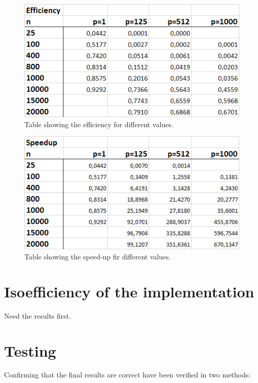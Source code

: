\documentclass[a4paper,11pt,oneside]{book}
\begin{document}
\begin{figure}[H]
  \centering
  \includegraphics[width=0.9\linewidth]{table-eff.png}
  \caption{Table showing the efficiency for different values.}
  \centering
  \label{fig:sub1}
\end{figure}
\begin{figure}[H]
  \centering
  \includegraphics[width=0.9\linewidth]{table-speedup.png}
  \caption{Table showing the speed-up fir different values.}
  \centering
  \label{fig:sub1}
\end{figure}

\chapter{Isoefficiency of the implementation}
Need the results first.

\chapter{Testing}
Confirming that the final results are correct have been verified in two methods:
\end{document}
